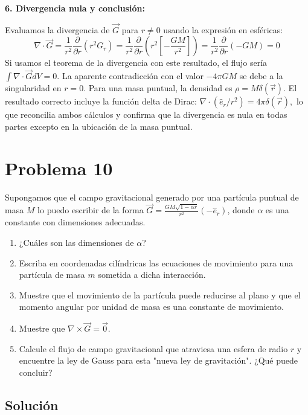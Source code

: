 \documentclass[a4paper]{article}
\begin{document}
\textbf{6. Divergencia nula y conclusión:}

Evaluamos la divergencia de $\vec{G}$ para $r \neq 0$ usando la expresión en esféricas:
\begin{equation}
\nabla \cdot \vec{G} = \frac{1}{r^2} \frac{\partial}{\partial r} (r^2 G_r) = \frac{1}{r^2} \frac{\partial}{\partial r} \left( r^2 \left[ -\frac{GM}{r^2} \right] \right) = \frac{1}{r^2} \frac{\partial}{\partial r} (-GM) = 0
\end{equation}
Si usamos el teorema de la divergencia con este resultado, el flujo sería $\int \nabla \cdot \vec{G} dV = 0.$ La aparente contradicción con el valor $-4\pi GM$ se debe a la singularidad en $r=0.$ Para una masa puntual, la densidad es $\rho = M\delta(\vec{r}).$ El resultado correcto incluye la función delta de Dirac: $\nabla \cdot (\hat{e}_r/r^2) = 4\pi \delta(\vec{r}),$ lo que reconcilia ambos cálculos y confirma que la divergencia es nula en todas partes excepto en la ubicación de la masa puntual.


\section{Problema 10}
Supongamos que el campo gravitacional generado por una partícula puntual de masa $M$ lo puedo escribir de la forma $\vec{G} = \frac{GM \sqrt{1-\alpha r}}{r^2} (-\hat{e}_r)$, donde $\alpha$ es una constante con dimensiones adecuadas.
\begin{enumerate}
    \item ¿Cuáles son las dimensiones de $\alpha$?
    \item Escriba en coordenadas cilíndricas las ecuaciones de movimiento para una partícula de masa $m$ sometida a dicha interacción.
    \item Muestre que el movimiento de la partícula puede reducirse al plano y que el momento angular por unidad de masa es una constante de movimiento.
    \item Muestre que $\nabla \times \vec{G} = \vec{0}$.
    \item Calcule el flujo de campo gravitacional que atraviesa una esfera de radio $r$ y encuentre la ley de Gauss para esta "nueva ley de gravitación". ¿Qué puede concluir?
\end{enumerate}

\subsection{Solución}
\end{document}
